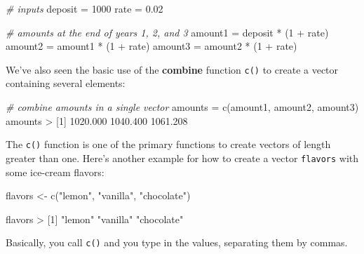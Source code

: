 \documentclass[
]{book}
\newenvironment{Shaded}{\begin{snugshade}}{\end{snugshade}}
\newcommand{\CommentTok}[1]{\textcolor[rgb]{0.56,0.35,0.01}{\textit{#1}}}
\newcommand{\DecValTok}[1]{\textcolor[rgb]{0.00,0.00,0.81}{#1}}
\newcommand{\FloatTok}[1]{\textcolor[rgb]{0.00,0.00,0.81}{#1}}
\newcommand{\FunctionTok}[1]{\textcolor[rgb]{0.00,0.00,0.00}{#1}}
\newcommand{\NormalTok}[1]{#1}
\newcommand{\OtherTok}[1]{\textcolor[rgb]{0.56,0.35,0.01}{#1}}
\newcommand{\SpecialCharTok}[1]{\textcolor[rgb]{0.00,0.00,0.00}{#1}}
\newcommand{\StringTok}[1]{\textcolor[rgb]{0.31,0.60,0.02}{#1}}
\begin{document}
\begin{Shaded}
\begin{Highlighting}[]
\CommentTok{\# inputs}
\NormalTok{deposit }\OtherTok{=} \DecValTok{1000}
\NormalTok{rate }\OtherTok{=} \FloatTok{0.02}

\CommentTok{\# amounts at the end of years 1, 2, and 3}
\NormalTok{amount1 }\OtherTok{=}\NormalTok{ deposit }\SpecialCharTok{*}\NormalTok{ (}\DecValTok{1} \SpecialCharTok{+}\NormalTok{ rate)}
\NormalTok{amount2 }\OtherTok{=}\NormalTok{ amount1 }\SpecialCharTok{*}\NormalTok{ (}\DecValTok{1} \SpecialCharTok{+}\NormalTok{ rate)}
\NormalTok{amount3 }\OtherTok{=}\NormalTok{ amount2 }\SpecialCharTok{*}\NormalTok{ (}\DecValTok{1} \SpecialCharTok{+}\NormalTok{ rate)}
\end{Highlighting}
\end{Shaded}

We've also seen the basic use of the \textbf{combine} function \texttt{c()} to create a
vector containing several elements:

\begin{Shaded}
\begin{Highlighting}[]
\CommentTok{\# combine amounts in a single vector}
\NormalTok{amounts }\OtherTok{=} \FunctionTok{c}\NormalTok{(amount1, amount2, amount3)}
\NormalTok{amounts}
\SpecialCharTok{\textgreater{}}\NormalTok{ [}\DecValTok{1}\NormalTok{] }\FloatTok{1020.000} \FloatTok{1040.400} \FloatTok{1061.208}
\end{Highlighting}
\end{Shaded}

The \texttt{c()} function is one of the primary functions to create vectors of length
greater than one. Here's another example for how to create a vector \texttt{flavors}
with some ice-cream flavors:

\begin{Shaded}
\begin{Highlighting}[]
\NormalTok{flavors }\OtherTok{\textless{}{-}} \FunctionTok{c}\NormalTok{(}\StringTok{"lemon"}\NormalTok{, }\StringTok{"vanilla"}\NormalTok{, }\StringTok{"chocolate"}\NormalTok{)}

\NormalTok{flavors}
\SpecialCharTok{\textgreater{}}\NormalTok{ [}\DecValTok{1}\NormalTok{] }\StringTok{"lemon"}     \StringTok{"vanilla"}   \StringTok{"chocolate"}
\end{Highlighting}
\end{Shaded}

Basically, you call \texttt{c()} and you type in the values, separating them by
commas.
\end{document}
